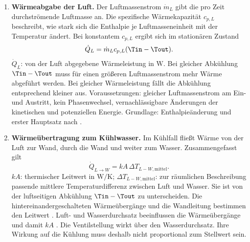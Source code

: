 \begin{enumerate}
  \item \textbf{Wärmeabgabe der Luft.}
    Der Luftmassenstrom $\dot m_L$ gibt die pro Zeit durchströmende
    Luftmasse an. Die spezifische Wärmekapazität $c_{p,L}$ beschreibt,
    wie stark sich die Enthalpie je Luftmasseneinheit mit der Temperatur
    ändert. Bei konstantem $c_{p,L}$ ergibt sich im stationären Zustand
    \begin{equation}
      \label{eq.grundlagen.basic.luftleistung}
      \dot Q_L=\dot m_L c_{p,L}(\Tin-\Tout).
    \end{equation}
    $\dot Q_L$: von der Luft abgegebene Wärmeleistung in $\mathrm{W}$.
    Bei gleicher Abkühlung $\Tin-\Tout$ muss für einen größeren
    Luftmassenstrom mehr Wärme abgeführt werden. Bei gleicher
    Wärmeleistung fällt die Abkühlung entsprechend kleiner aus.
    Voraussetzungen: gleicher Luftmassenstrom am Ein- und Austritt,
    kein Phasenwechsel, vernachlässigbare Änderungen der kinetischen
    und potenziellen Energie. Grundlage: Enthalpieänderung und erster
    Hauptsatz nach \cite[S.~821, Gl.~31.5--31.6]{almbauerThermomanagement2019}.

  \item \textbf{Wärmeübertragung zum Kühlwasser.}
    Im Kühlfall fließt Wärme von der Luft zur Wand, durch die Wand und weiter
    zum Wasser. Zusammengefasst gilt
    \begin{equation}
      \label{eq.grundlagen.basic.waermedurchgang}
      \dot Q_{L\to W}=kA\,\Delta T_{L-W,\mathrm{mittel}}.
    \end{equation}
    $kA$: thermischer Leitwert in $\mathrm{W/K}$;
    $\Delta T_{L-W,\mathrm{mittel}}$: zur räumlichen Beschreibung
    passende mittlere Temperaturdifferenz zwischen Luft und Wasser.
    Sie ist von der luftseitigen Abkühlung $\Tin-\Tout$ zu unterscheiden.
    Die hintereinandergeschalteten Wärmeübergänge und die Wandleitung
    bestimmen den Leitwert
    \cite[S.~256, Gl.~12.3--12.7]{pucherLadeluftkuehlungUndLadeluftkuehler2012}.
    Luft- und Wasserdurchsatz beeinflussen die Wärmeübergänge und damit
    $kA$ \cite[S.~838--839, Gl.~31.59--31.62]{almbauerThermomanagement2019}.
    Die Ventilstellung wirkt über den Wasserdurchsatz. Ihre Wirkung
    auf die Kühlung muss deshalb nicht proportional zum Stellwert sein.


\end{enumerate}
